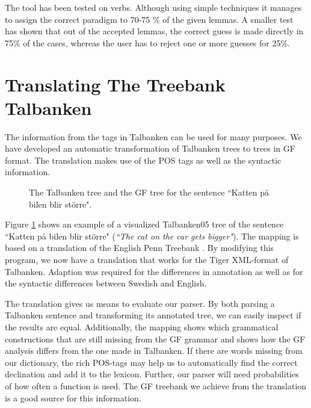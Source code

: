 \documentclass[10pt, a4paper]{article}
\begin{document}
The tool has been tested on verbs. Although using simple techniques it 
manages to assign the correct paradigm to 70-75 \% of the given lemmas.
A smaller test has shown that out of the accepted lemmas, the correct guess is
made directly in 75\% of the cases, whereas the user has to reject one or more
guesses for 25\%. 




\section{Translating The Treebank Talbanken}
\label{sec:mapping}
The information from the tags in Talbanken can be used for many purposes.
We have developed an automatic transformation of Talbanken trees 
to trees in GF format. The translation makes use of the POS tags as well as
the syntactic information. 
\begin{figure}[h!]
\begin{center}
\hspace{-30mm}
\hspace{-10mm}
\caption{The Talbanken tree and the GF tree for the sentence ``Katten p{\aa} bilen blir st{\"o}rre".}
\label{fig:translationtrees}
\end{center}
\end{figure}


Figure \ref{fig:translationtrees} shows an example of a visualized Talbanken05 tree
of the sentence ``Katten p{\aa} bilen blir st{\"o}rre" 
(\emph{``The cat on the car gets bigger"}).
The mapping is based on 
a translation of the English Penn Treebank \cite{gfpenn}.
By modifying this program, we now have a translation that works for
the Tiger XML-format of
Talbanken. Adaption was required for the differences in annotation as well as 
for the syntactic differences between Swedish and English.

The translation %
gives us means to evaluate our parser. By both parsing a Talbanken sentence and
transforming its annotated tree, we can easily inspect if the results are
equal.
Additionally, the mapping shows which grammatical constructions that are still missing
from the GF grammar and shows how the GF analysis differs from the one made
in Talbanken.
If there are words missing from our dictionary, the rich
POS-tags may help us to automatically find the correct declination and add it to the
lexicon. Further, our parser will need probabilities of how often a function is
used. The GF treebank we achieve from the translation is a good source for this
information.\\
\end{document}
